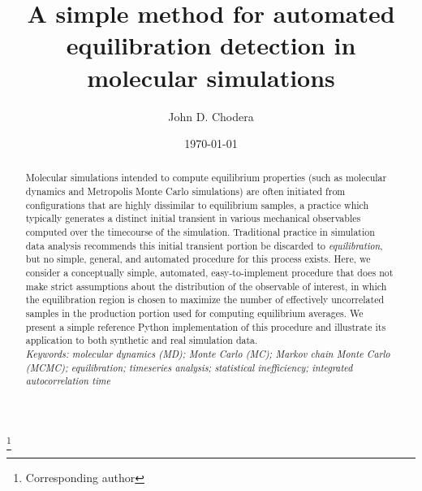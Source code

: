 \documentclass[aps,pre,twocolumn,nofootinbib,superscriptaddress,linenumbers,11point]{revtex4-1}
\begin{document}

\title{A simple method for automated equilibration detection in molecular simulations}

\author{John D. Chodera}
 \thanks{Corresponding author}

\date{\today}


\begin{abstract}

Molecular simulations intended to compute equilibrium properties (such as molecular dynamics and Metropolis Monte Carlo simulations) are often initiated from configurations that are highly dissimilar to equilibrium samples, a practice which typically generates a distinct initial transient in various mechanical observables computed over the timecourse of the simulation.
Traditional practice in simulation data analysis recommends this initial transient portion be discarded to \emph{equilibration}, but no simple, general, and automated procedure for this process exists.
Here, we consider a conceptually simple, automated, easy-to-implement procedure that does not make strict assumptions about the distribution of the observable of interest, in which the equilibration region is chosen to maximize the number of effectively uncorrelated samples in the production portion used for computing equilibrium averages.
We present a simple reference Python implementation of this procedure and illustrate its application to both synthetic and real simulation data.\\

\emph{Keywords: molecular dynamics (MD); Monte Carlo (MC); Markov chain Monte Carlo (MCMC); equilibration; timeseries analysis; statistical inefficiency; integrated autocorrelation time}

\end{abstract}

\maketitle
\end{document}
